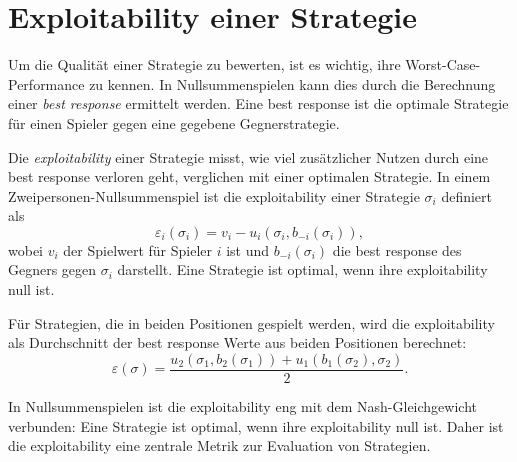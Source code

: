 \section{Exploitability einer Strategie}

Um die Qualität einer Strategie zu bewerten, ist es wichtig, ihre Worst-Case-Performance zu kennen.
In Nullsummenspielen kann dies durch die Berechnung einer \emph{best response} ermittelt werden.
Eine best response ist die optimale Strategie für einen Spieler gegen eine gegebene Gegnerstrategie.

Die \emph{exploitability} einer Strategie misst, wie viel zusätzlicher Nutzen durch eine best response verloren geht, verglichen mit einer optimalen Strategie.
In einem Zweipersonen-Nullsummenspiel ist die exploitability einer Strategie $\sigma_i$ definiert als
\begin{equation}
\varepsilon_i(\sigma_i) = v_i - u_i(\sigma_i, b_{-i}(\sigma_i)),
\end{equation}
wobei $v_i$ der Spielwert für Spieler $i$ ist und $b_{-i}(\sigma_i)$ die best response des Gegners gegen $\sigma_i$ darstellt.
Eine Strategie ist optimal, wenn ihre exploitability null ist.

Für Strategien, die in beiden Positionen gespielt werden, wird die exploitability als Durchschnitt der best response Werte aus beiden Positionen berechnet:
\begin{equation}
\varepsilon(\sigma) = \frac{u_2(\sigma_1, b_2(\sigma_1)) + u_1(b_1(\sigma_2), \sigma_2)}{2}.
\end{equation}

In Nullsummenspielen ist die exploitability eng mit dem Nash-Gleichgewicht verbunden: Eine Strategie ist optimal, wenn ihre exploitability null ist.
Daher ist die exploitability eine zentrale Metrik zur Evaluation von Strategien.







